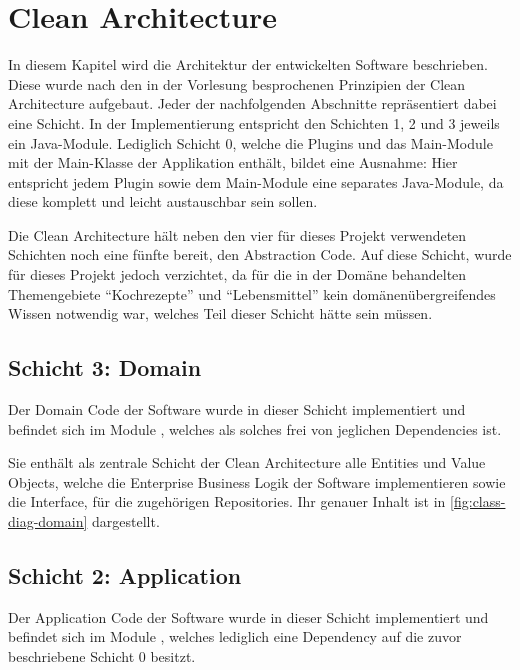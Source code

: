 \chapter{Clean Architecture}
In diesem Kapitel wird die Architektur der entwickelten Software beschrieben. Diese wurde nach den in der Vorlesung besprochenen Prinzipien der Clean Architecture aufgebaut. Jeder der nachfolgenden Abschnitte repräsentiert dabei eine Schicht. In der Implementierung entspricht den Schichten 1, 2 und 3 jeweils ein Java-Module. Lediglich Schicht 0, welche die Plugins und das Main-Module mit der Main-Klasse der Applikation enthält, bildet eine Ausnahme: Hier entspricht jedem Plugin sowie dem Main-Module eine separates Java-Module, da diese komplett und leicht austauschbar sein sollen.

Die Clean Architecture hält neben den vier für dieses Projekt verwendeten Schichten noch eine fünfte bereit, den Abstraction Code. Auf diese Schicht, wurde für dieses Projekt jedoch verzichtet, da für die in der Domäne behandelten Themengebiete \enquote{Kochrezepte} und \enquote{Lebensmittel} kein domänenübergreifendes Wissen notwendig war, welches Teil dieser Schicht hätte sein müssen. 

\section{Schicht 3: Domain}
Der Domain Code der Software wurde in dieser Schicht implementiert und befindet sich im Module , welches als solches frei von jeglichen Dependencies ist.

Sie enthält als zentrale Schicht der Clean Architecture alle Entities und Value Objects, welche die Enterprise Business Logik der Software implementieren sowie die Interface, für die zugehörigen Repositories. Ihr genauer Inhalt ist in \autoref{fig:class-diag-domain} dargestellt.

\section{Schicht 2: Application}
Der Application Code der Software wurde in dieser Schicht implementiert und befindet sich im Module , welches lediglich eine Dependency auf die zuvor beschriebene Schicht 0 besitzt.


